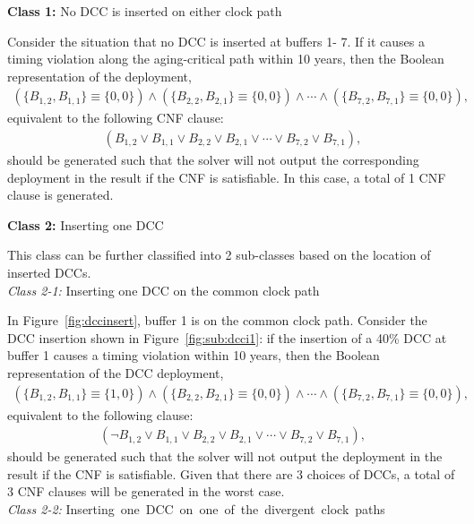 \noindent \textbf{Class 1:} No DCC is inserted on either clock path

Consider the situation that no DCC is inserted at buffers 1- 7. If it causes a timing violation along the aging-critical path within 10 years, then the Boolean representation of the deployment,
{\fontsize{9}{10}
\begin{gather*}
\left(\{B_{1,2}, B_{1,1}\} \equiv \{0, 0\} \right) \land \left( \{B_{2,2}, B_{2,1}\} \equiv \{0, 0\} \right) \land \dotsb 
\land \left( \{B_{7,2}, B_{7,1}\} \equiv \{0, 0\} \right),
\end{gather*}}
equivalent to the following CNF clause:
{\fontsize{9}{10}
\begin{gather*}
\left(B_{1,2} \lor B_{1,1} \lor B_{2,2} \lor B_{2,1} \lor \dotsb \lor B_{7,2} \lor B_{7,1} \right),
\end{gather*}}
should be generated such that the solver will not output the corresponding deployment in the result if the CNF is satisfiable. In this case, a total of 1 CNF clause is generated.


\noindent \textbf{Class 2:} Inserting one DCC

This class can be further classified into 2 sub-classes based on the location of inserted DCCs. \\
\textit{Class 2-1:} Inserting one DCC on the common clock path

In Figure~\ref{fig:dccinsert}, buffer 1 is on the common clock path. Consider the DCC insertion shown in Figure~\ref{fig:sub:dcci1}: if the insertion of a 40\% DCC at buffer 1 causes a timing violation within 10 years, then the Boolean representation of the DCC deployment,
{\fontsize{9}{10}
\begin{gather*}
\left(\{B_{1,2}, B_{1,1}\} \equiv \{1, 0\} \right) \land \left( \{B_{2,2}, B_{2,1}\} \equiv \{0, 0\} \right) \land \dotsb 
\land \left( \{B_{7,2}, B_{7,1}\} \equiv \{0, 0\} \right),
\end{gather*}}equivalent to the following clause:
{\fontsize{9}{10}
\begin{gather*}
\left(\neg B_{1,2} \lor B_{1,1} \lor B_{2,2} \lor B_{2,1} \lor \dotsb \lor B_{7,2} \lor B_{7,1} \right),
\end{gather*}}should be generated such that the solver will not output the deployment in the result if the CNF is satisfiable. Given that there are 3 choices of DCCs, a total of 3 CNF clauses will be generated in the worst case. \\
\textit{Class 2-2:} \mbox{\fontsize{9}{10.8}\selectfont Inserting one DCC on one of the divergent clock paths}

